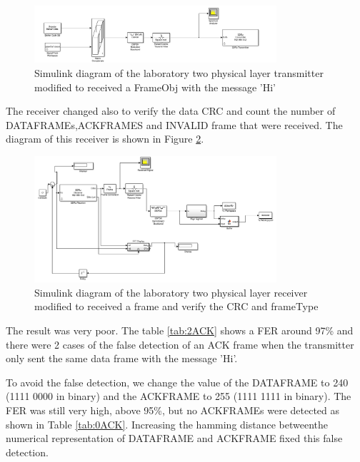 \begin{figure}[ht]
    \centering
    \includegraphics[width=0.8\textwidth]{trasmitter_lab02.PNG}
    \caption{Simulink diagram of the laboratory two physical layer transmitter modified to received a FrameObj with the message 'Hi' }
    \label{fig:trasmitter_lab02}
\end{figure}

The receiver changed also to verify the data CRC and count the number of DATAFRAMEs,ACKFRAMES and INVALID frame that were received. The diagram of this receiver is
shown in Figure \ref{fig:receiver_lab02}.

\begin{figure}[ht]
    \centering
    \includegraphics[width=0.8\textwidth]{receiver_lab02.PNG}
    \caption{Simulink diagram of the laboratory two physical layer receiver modified to received a frame and verify the CRC and frameType }
    \label{fig:receiver_lab02}
\end{figure}


The result was very poor. The table \ref{tab:2ACK} shows a FER around 97\% and there were 2 cases of the false detection of an ACK frame when the transmitter only sent
the same data frame with the message 'Hi'.  


To avoid the false detection, we change the value of the DATAFRAME to 240 (1111 0000 in binary) and the ACKFRAME to 255 (1111 1111 in binary).
The FER was still very high, above 95\%, but no ACKFRAMEs were detected as shown in Table \ref{tab:0ACK}. Increasing the hamming distance betweenthe numerical representation of DATAFRAME and ACKFRAME
fixed this false detection.
 
